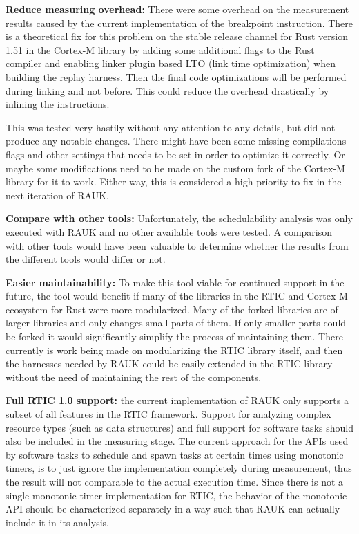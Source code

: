 \textbf{Reduce measuring overhead:} There were some overhead on the measurement
results caused by the current implementation of the breakpoint instruction.
There is a theoretical fix for this problem on the stable release channel for
Rust version 1.51 in the Cortex-M library by adding some additional flags to
the Rust compiler and enabling linker plugin based LTO (link time optimization)
when building the replay harness. Then the final code optimizations will be
performed during linking and not before. This could reduce the overhead
drastically by inlining the instructions. 

This was tested very hastily without any attention to any details, but did not
produce any notable changes. There might have been some missing compilations
flags and other settings that needs to be set in order to optimize it
correctly. Or maybe some modifications need to be made on the custom fork of
the Cortex-M library for it to work. Either way, this is considered a high
priority to fix in the next iteration of RAUK\@.

\textbf{Compare with other tools:} Unfortunately, the schedulability analysis
was only executed with RAUK and no other available tools were tested. A
comparison with other tools would have been valuable to determine whether the
results from the different tools would differ or not. 

\textbf{Easier maintainability:} To make this tool viable for continued support
in the future, the tool would benefit if many of the libraries in the RTIC and
Cortex-M ecosystem for Rust were more modularized. Many of the forked libraries
are of larger libraries and only changes small parts of them. If only smaller
parts could be forked it would significantly simplify the process of
maintaining them. There currently is work being made on modularizing the RTIC
library itself, and then the harnesses needed by RAUK could be easily extended
in the RTIC library without the need of maintaining the rest of the components.

\textbf{Full RTIC 1.0 support:} the current implementation of RAUK only supports
a subset of all features in the RTIC framework. Support for analyzing complex
resource types (such as data structures) and full support for software tasks
should also be included in the measuring stage. The current approach for the APIs
used by software tasks to schedule and spawn tasks at certain times using
monotonic timers, is to just ignore the implementation completely during
measurement, thus the result will not comparable to the actual execution time.
Since there is not a single monotonic timer implementation for RTIC, the
behavior of the monotonic API should be characterized separately in a way such
that RAUK can actually include it in its analysis.

